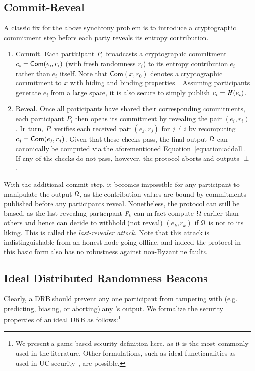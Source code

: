 \subsection{Commit-Reveal}
\label{subsection:commit-reveal}
A classic fix for the above synchrony problem is to introduce a cryptographic commitment step before each party reveals its entropy contribution.
\begin{enumerate}
\item \underline{Commit}. Each participant $P_i$ broadcasts a cryptographic commitment $c_i = \mathsf{Com}(e_i, r_i)$ (with fresh randomness $r_i$) to its entropy contribution $e_i$ rather than $e_i$ itself. Note that $\mathsf{Com}(x, r_0)$ denotes a cryptographic commitment to $x$ with hiding and binding properties~\cite{blum1983coin,damgaard1998commitment}. Assuming participants generate $e_i$ from a large space, it is also secure to simply publish $c_i = H(e_i)$.
\item \underline{Reveal}. Once all participants have shared their corresponding commitments, each participant $P_i$ then opens its commitment by revealing the pair $(e_i, r_i)$. In turn, $P_i$ verifies each received pair $(e_j, r_j)$ for $j \neq i$ by recomputing $c_j = \mathsf{Com}(e_j, r_j)$. Given that these checks pass, the final output $\Omega$ can canonically be computed via the aforementioned Equation~\ref{equation:addall}. If any of the checks do not pass, however, the protocol aborts and outputs $\perp$.
\end{enumerate}

With the additional commit step, it becomes impossible for any participant to manipulate the output $\Omega$, as the contribution values are bound by commitments published before any participants reveal. Nonetheless, the protocol can still be biased, as the last-revealing participant $P_k$ can in fact compute $\Omega$ earlier than others and hence can decide to withhold (not reveal) $(e_k, r_k)$ if $\Omega$ is not to its liking. This is called the \textit{last-revealer attack}. Note that this attack is indistinguishable from an honest node going offline, and indeed the protocol in this basic form also has no robustness against non-Byzantine faults.

\subsection{Ideal Distributed Randomness Beacons}
Clearly, a DRB should prevent any one participant from tampering with (e.g. predicting, biasing, or aborting) any \epoch's output.
We formalize the security properties of an ideal DRB as follows:\footnote{We present a game-based security definition here, as it is the most commonly used in the literature. Other formulations, such as ideal functionalities as used in UC-security~\cite{canetti2001universally}, are possible.}

